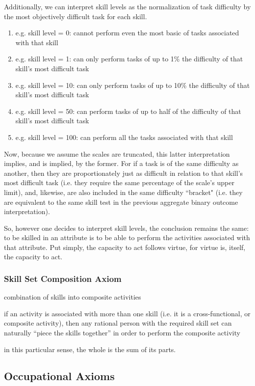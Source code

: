 \documentclass{elsarticle} %
\begin{document}
Additionally, we can interpret skill levels as the normalization of task difficulty by the most objectively difficult task for each skill.
\begin{enumerate}
    \item e.g. skill level = 0: cannot perform even the most basic of tasks associated with that skill
    \item e.g. skill level = 1: can only perform tasks of up to 1\% the difficulty of that skill's most difficult task
    \item e.g. skill level = 10: can only perform tasks of up to 10\% the difficulty of that skill's most difficult task
    \item e.g. skill level = 50: can perform tasks of up to half of the difficulty of that skill's most difficult task
    \item e.g. skill level = 100: can perform all the tasks associated with that skill
\end{enumerate}

Now, because we assume the scales are truncated, this latter interpretation implies, and is implied, by the former. For if a task is of the same difficulty as another, then they are proportionately just as difficult in relation to that skill's most difficult task (i.e. they require the same percentage of the scale's upper limit), and, likewise, are also included in the same difficulty ``bracket" (i.e. they are equivalent to the same skill test in the previous aggregate binary outcome interpretation).

So, however one decides to interpret skill levels, the conclusion remains the same: to be skilled in an attribute is to be able to perform the activities associated with that attribute. Put simply, the capacity to act follows virtue, for virtue is, itself, the capacity to act.

\subsubsection{Skill Set Composition Axiom}
combination of skills into composite activities

if an activity is associated with more than one skill (i.e. it is a cross-functional, or composite activity), then any rational person with the required skill set can naturally ``piece the skills together'' in order to perform the composite activity

in this particular sense, the whole is the sum of its parts.

\subsection{Occupational Axioms}
\end{document}

